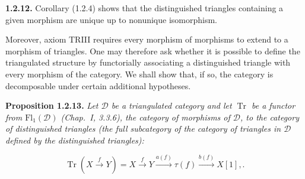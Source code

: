 \medskip
\noindent\textbf{1.2.12.}\quad
Corollary (1.2.4) shows that the distinguished triangles containing a given
morphism are unique up to nonunique isomorphism.

Moreover, axiom TRIII requires every morphism of morphisms to extend to a
morphism of triangles. One may therefore ask whether it is possible to
define the triangulated structure by functorially associating a
distinguished triangle with every morphism of the category. We shall show
that, if so, the category is decomposable under certain additional
hypotheses.

\medskip
\noindent\textbf{Proposition 1.2.13.}\quad
\textit{Let $\mathcal D$ be a triangulated category and let
$\operatorname{Tr}$ be a functor from $\mathrm{Fl}_1(\mathcal D)$
(Chap.~I, 3.3.6), the category of morphisms of $\mathcal D$, to the
category of distinguished triangles (the full subcategory of the category
of triangles in $\mathcal D$ defined by the distinguished triangles):}

\[
  \operatorname{Tr}\!\left(X\xrightarrow{f}Y\right)
  =X\xrightarrow{f}Y\xrightarrow{a(f)}\tau(f)
  \xrightarrow{b(f)}X[1], .
\]
\endgroup
